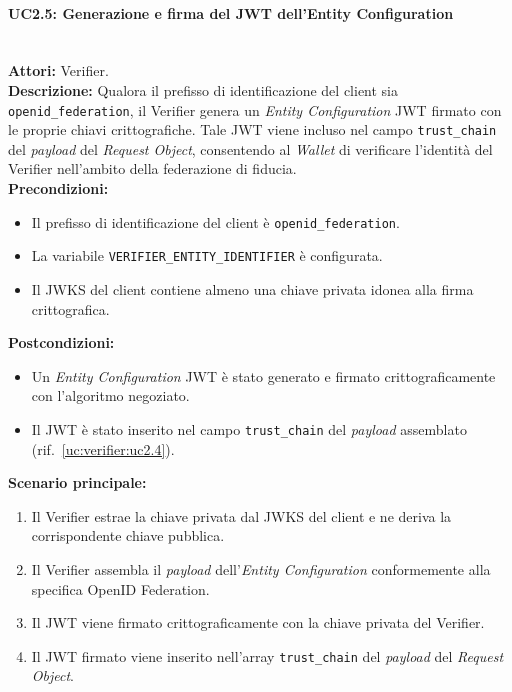 \paragraph{\large\bfseries UC2.5: Generazione e firma del JWT dell'Entity Configuration}
\label{uc:verifier:uc2.5}
\mbox{}\\
\noindent\textbf{Attori:} Verifier.
\\
\noindent\textbf{Descrizione:} Qualora il prefisso di identificazione del client sia \texttt{openid\_\allowbreak{}federation}, il Verifier genera un \textit{Entity Configuration} JWT firmato con le proprie chiavi crittografiche. Tale JWT viene incluso nel campo \texttt{trust\_\allowbreak{}chain} del \textit{payload} del \textit{Request Object}, consentendo al \textit{Wallet} di verificare l'identità del Verifier nell'ambito della federazione di fiducia.
\\
\noindent\textbf{Precondizioni:}
\begin{itemize}
    \item Il prefisso di identificazione del client è \texttt{openid\_\allowbreak{}federation}.
    \item La variabile \texttt{VERIFIER\_\allowbreak{}ENTITY\_\allowbreak{}IDENTIFIER} è configurata.
    \item Il JWKS del client contiene almeno una chiave privata idonea alla firma crittografica.
\end{itemize}
\noindent\textbf{Postcondizioni:}
\begin{itemize}
    \item Un \textit{Entity Configuration} JWT è stato generato e firmato crittograficamente con l'algoritmo negoziato.
    \item Il JWT è stato inserito nel campo \texttt{trust\_\allowbreak{}chain} del \textit{payload} assemblato (rif.\ \ref{uc:verifier:uc2.4}).
\end{itemize}
\noindent\textbf{Scenario principale:}
\begin{enumerate}
    \item Il Verifier estrae la chiave privata dal JWKS del client e ne deriva la corrispondente chiave pubblica.
    \item Il Verifier assembla il \textit{payload} dell'\textit{Entity Configuration} conformemente alla specifica OpenID Federation.
    \item Il JWT viene firmato crittograficamente con la chiave privata del Verifier.
    \item Il JWT firmato viene inserito nell'array \texttt{trust\_\allowbreak{}chain} del \textit{payload} del \textit{Request Object}.
\end{enumerate}
